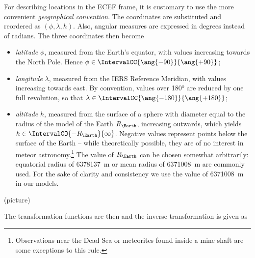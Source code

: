         For describing locations in the ECEF frame, it is customary to use the
        more convenient \emph{geographical convention}. The coordinates are substituted
        and reordered as $(\phi, \lambda, h)$.
        Also, angular measures are expressed in degrees instead of radians.
        The three coordinates then become
        \begin{itemize}
            \item \emph{latitude} $\phi$,
                measured from the Earth's equator, with values increasing towards the North Pole.
                Hence $\phi \in \IntervalCC{\ang{-90}}{\ang{+90}}$;
            \item \emph{longitude} $\lambda$, measured from the IERS Reference Meridian,
                with values increasing towards east. By convention, values over \ang{180} are
                reduced by one full revolution, so that $\lambda \in \IntervalCC{\ang{-180}}{\ang{+180}}$;
            \item \emph{altitude} $h$, measured from the surface of a sphere
                with diameter equal to the radius of the model of the Earth $R_\Earth$, increasing outwards,
                which yields $h \in \IntervalCO{-R_\Earth}{\infty}$.
                Negative values represent points below the surface of the Earth --
                while theoretically possible, they are of no interest in meteor
                astronomy.\footnote{Observations near the Dead Sea or meteorites
                found inside a mine shaft are some exceptions to this rule.}
                The value of $R_\Earth$ can be chosen somewhat arbitrarily:
                equatorial radius of \SI{6378137}{\metre} or mean radius of \SI{6371008}{\metre} are commonly used.
                For the sake of clarity and consistency we use the value of \SI{6371008}{\metre} in our models.
        \end{itemize}

        (picture)

        The transformation functions are then
        and the inverse transformation is given as

